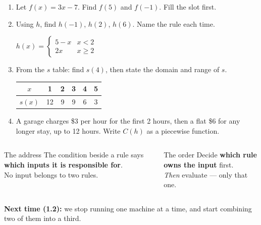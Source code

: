\documentclass[aspectratio=169, 11pt]{beamer}
\begin{document}
\begin{frame}[t, plain]

  \begin{enumerate}\setlength{\itemsep}{8pt}
    \setcounter{enumi}{14}
    \item Let \(f(x) = 3x - 7\). Find \(f(5)\) and \(f(-1)\). Fill the slot first.
    \item Using \(h\), find \(h(-1)\), \(h(2)\), \(h(6)\). Name the rule each time.

          \smallskip
          \(h(x) = \begin{cases} 5 - x & x < 2 \\[2pt] 2x & x \ge 2 \end{cases}\)
    \item From the \(s\) table: find \(s(4)\), then state the domain and range of \(s\).

          \smallskip
          \begin{tabular}{|c|c|c|c|c|c|}
          \hline
          \(x\) & 1 & 2 & 3 & 4 & 5 \\
          \hline
          \(s(x)\) & 12 & 9 & 9 & 6 & 3 \\
          \hline
          \end{tabular}
    \item A garage charges \$3 per hour for the first 2 hours, then a flat \$6 for
          any longer stay, up to 12 hours. Write \(C(h)\) as a piecewise function.
  \end{enumerate}
\end{frame}

\begin{frame}[t, plain]

  \begin{columns}[T]
      \begin{block}{The address}
        The condition beside a rule says \textbf{which inputs it is responsible
        for}.\\[3pt]
        No input belongs to two rules.
      \end{block}
      \begin{block}{The order}
        Decide \textbf{which rule owns the input} first.\\[3pt]
        \textit{Then} evaluate --- only that one.
      \end{block}
  \end{columns}

  \bigskip
  \textbf{Next time (1.2):} we stop running one machine at a time, and start
  combining two of them into a third.
\end{frame}
\end{document}
